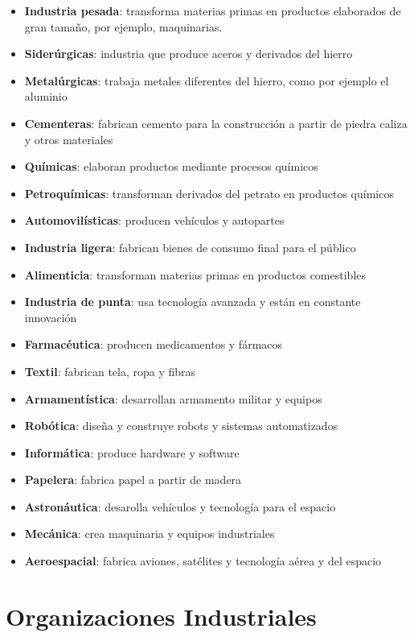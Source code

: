 \documentclass{report}
\begin{document}
\begin{itemize}
    \item \textbf{Industria pesada}: transforma materias primas en productos elaborados de gran tamaño, por ejemplo, maquinarias.
    \item \textbf{Siderúrgicas}: industria que produce aceros y derivados del hierro
    \item \textbf{Metalúrgicas}: trabaja metales diferentes del hierro, como por ejemplo el aluminio
    \item \textbf{Cementeras}: fabrican cemento para la construcción a partir de piedra caliza y otros materiales
    \item \textbf{Químicas}: elaboran productos mediante procesos químicos
    \item \textbf{Petroquímicas}: transforman derivados del petrato en productos químicos
    \item \textbf{Automovilísticas}: producen vehículos y autopartes
    \item \textbf{Industria ligera}: fabrican bienes de consumo final para el público
    \item \textbf{Alimenticia}: transforman materias primas en productos comestibles
    \item \textbf{Industria de punta}: usa tecnología avanzada y están en constante innovación
    \item \textbf{Farmacéutica}: producen medicamentos y fármacos
    \item \textbf{Textil}: fabrican tela, ropa y fibras
    \item \textbf{Armamentística}: desarrollan armamento militar y equipos
    \item \textbf{Robótica}: diseña y construye robots y sistemas automatizados
    \item \textbf{Informática}: produce hardware y software
    \item \textbf{Papelera}: fabrica papel a partir de madera
    \item \textbf{Astronáutica}: desarolla vehículos y tecnología para el espacio
    \item \textbf{Mecánica}: crea maquinaria y equipos industriales
    \item \textbf{Aeroespacial}: fabrica aviones, satélites y tecnología aérea y del espacio
\end{itemize}

\chapter{Organizaciones Industriales}
\end{document}
